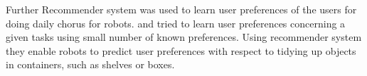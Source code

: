 Further Recommender system was used to learn user preferences of the users for
doing daily chorus for robots. \cite{abdo_collaborative_2014} and
\cite{abdo_robot_2015} tried to learn user preferences concerning a given
tasks using small number of known preferences. Using recommender system they
enable robots to predict user preferences with respect to tidying up objects in
containers,  such  as  shelves  or  boxes.



